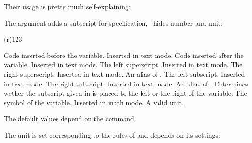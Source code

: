 \documentclass[load-preamble+]{cnltx-doc}
\begin{document}
Their usage is pretty much self-explaining:
\begin{example}
   \par
   \par
\end{example}
The argument  adds a subscript for specification, \sarg\ hides
number and unit:
\begin{example}
    \enthalpy(r){123} \par
     \par
\end{example}

\begin{options}
    Code inserted before the variable.  Inserted in text mode.
  \Default
    Code inserted after the variable.  Inserted in text mode.
  \Default
    The left superscript.  Inserted in text mode.
    The right superscript. Inserted in text mode.
    An alias of .
  \Default
    The left subscript.  Inserted in text mode.
  \Default
    The right subscript.  Inserted in text mode.
    An alias of .
    Determines wether the subscript given in  is placed to the
    left or the right of the variable.
  \Default
    The symbol of the variable.  Inserted in math mode.
  \Default
    A valid  unit.
\end{options}

The default values depend on the command.
\begin{example}
   \par
   \par
\end{example}
The unit is set corresponding to the rules of  and depends on
its settings:
\begin{example}
   \par
\end{example}
\end{document}
